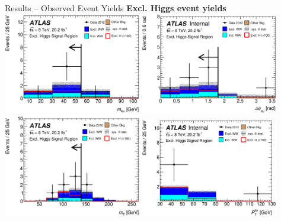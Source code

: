 \documentclass[10pt]{beamer}
\begin{document}
\begin{frame}{Results -- Observed Event Yields}
\centering
{\bf \color{blue} Excl. Higgs event yields}
\\
   \includegraphics[width=0.45\textwidth]{figures/emme_CutSR_Mll_nMinus1_MllnMinusOne.eps}
   \includegraphics[width=0.45\textwidth]{figures/emme_CutSR_DPhill_nMinus1_DPhillnMinusOne.eps}\\
   \includegraphics[width=0.45\textwidth]{figures/emme_CutSR_MT_nMinus1_MTexcl.eps}
   \includegraphics[width=0.45\textwidth]{figures/emme_CutSR_Ptll_nMinus1_PtllnMinusOne_130.eps}
\end{frame}
\end{document}
